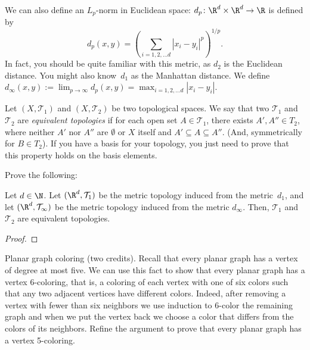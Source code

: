 \documentclass{article}
\begin{document}
\nextprob{}

We can also define an $L_p$-norm in Euclidean space:
$d_p \colon \R^d \times \R^d \to \R$ is defined by
$$d_p (x,y) = \left( \sum_{i=1,2, \ldots d} |x_i-y_i|^p \right)^{1/p}.$$
In fact, you should be quite familiar with this metric,
as $d_2$ is the Euclidean distance.  You might also know~$d_1$ as the
Manhattan distance.  We define $d_{\infty}(x,y) := \lim_{p \to \infty} d_p(x,y)
= \max_{i=1,2, \ldots d} |x_i - y_i|$.

Let $(X,\mathcal{T}_1)$ and $(X,\mathcal{T}_2)$ be two topological spaces.
We say that two $\mathcal{T}_1$ and $\mathcal{T}_2$ are \emph{equivalent topologies} if for each open set $A \in \mathcal{T}_1$,
there exists $A',A'' \in T_2$, where neither $A'$ nor $A''$ are $\emptyset$ or $X$
itself and $A' \subseteq A \subseteq A''$.  (And, symmetrically for $B \in
T_2$).  If you have a basis for your topology, you just need to prove that this
property holds on the basis elements.

Prove the following:

\begin{theorem}
    Let $d \in \N$.  Let $(\R^d,\mathcal{T}_1)$ be the metric topology induced from the
    metric~$d_1$, and let $(\R^d,\mathcal{T}_{\infty})$ be the metric topology induced from the
    metric $d_{\infty}$.
   Then, $\mathcal{T}_1$ and $\mathcal{T}_2$ are equivalent topologies.
\end{theorem}

\begin{proof}

  	
  
\end{proof}


Planar graph coloring (two credits). Recall that every planar graph has
a vertex of degree at most five. We can use this fact to show that every
planar graph has a vertex 6-coloring, that is, a coloring of each vertex with
one of six colors such that any two adjacent vertices have different colors.
Indeed, after removing a vertex with fewer than six neighbors we use
induction to 6-color the remaining graph and when we put the vertex back
we choose a color that differs from the colors of its neighbors. Refine the
argument to prove that every planar graph has a vertex 5-coloring.
\end{document}
